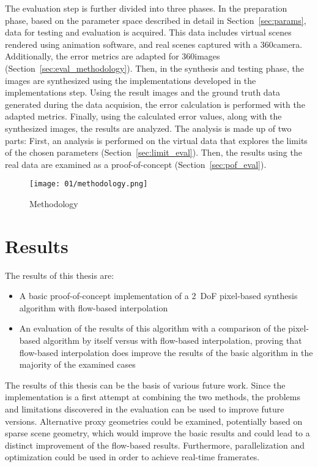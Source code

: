 The evaluation step is further divided into three phases. In the preparation phase, based on the parameter space described in detail in Section~\ref{sec:params}, data for testing and evaluation is acquired. This data includes virtual scenes rendered using animation software, and real scenes captured with a 360\degree camera. Additionally, the error metrics are adapted for 360\degree images (Section~\ref{sec:eval_methodology}).
Then, in the synthesis and testing phase, the images are synthesized using the implementations developed in the implementations step. Using the result images and the ground truth data generated during the data acquision, the error calculation is performed with the adapted metrics.
Finally, using the calculated error values, along with the synthesized images, the results are analyzed. The analysis is made up of two parts: First, an analysis is performed on the virtual data that explores the limits of the chosen parameters (Section~\ref{sec:limit_eval}). Then, the results using the real data are examined as a proof-of-concept (Section~\ref{sec:pof_eval}).

\begin{figure}
		\centering
		\texttt{[image: 01/methodology.png]}
		\caption{Methodology}
		\label{fig:methodology}
\end{figure}

\section*{Results}
The results of this thesis are:
\begin{itemize}
  \item A basic proof-of-concept implementation of a 2~DoF pixel-based synthesis algorithm with flow-based interpolation
  \item An evaluation of the results of this algorithm with a comparison of the pixel-based algorithm by itself versus with flow-based interpolation, proving that flow-based interpolation does improve the results of the basic algorithm in the majority of the examined cases
\end{itemize}

The results of this thesis can be the basis of various future work. Since the implementation is a first attempt at combining the two methods, the problems and limitations discovered in the evaluation can be used to improve future versions. Alternative proxy geometries could be examined, potentially based on sparse scene geometry, which would improve the basic results and could lead to a distinct improvement of the flow-based results. Furthermore, parallelization and optimization could be used in order to achieve real-time framerates. 

